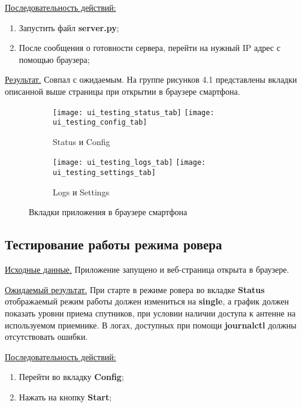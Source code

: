 \underline{Последовательность действий:}

\begin{enumerate}
  \item Запустить файл \textbf{server.py};
  \item После сообщения о готовности сервера, перейти на нужный IP адрес с помощью браузера;
\end{enumerate}

\underline{Результат.} Совпал с ожидаемым. На группе рисунков 4.1 представлены вкладки описанной выше страницы при открытии в браузере смартфона.

\begin{figure}
  \label{img:latex}
  \begin{subfigure}{\linewidth}
    \center
    \texttt{[image: ui\_testing\_status\_tab]}
    \texttt{[image: ui\_testing\_config\_tab]}
    \caption{Status и Config}
  \end{subfigure}\par\medskip
  \begin{subfigure}{\linewidth}
    \center
    \texttt{[image: ui\_testing\_logs\_tab]}
    \texttt{[image: ui\_testing\_settings\_tab]}
    \caption{Logs и Settings}
  \end{subfigure}\par\medskip
  \caption{Вкладки приложения в браузере смартфона}
\end{figure}

\clearpage

\subsection{Тестирование работы режима ровера} \label{subsect4_2_2}

\underline{Исходные данные.} Приложение запущено и веб-страница открыта в браузере.

\underline{Ожидаемый результат.} При старте в режиме ровера во вкладке \textbf{Status} отображаемый режим работы должен измениться на \textbf{single}, а график должен показать уровни приема спутников, при условии наличии доступа к антенне на используемом приемнике. В логах, доступных при помощи \textbf{journalctl} должны отсутствовать ошибки.

\underline{Последовательность действий:}

\begin{enumerate}
  \item Перейти во вкладку \textbf{Config};
  \item Нажать на кнопку \textbf{Start};
\end{enumerate}

